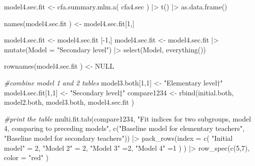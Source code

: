 \documentclass[
]{article}
\newenvironment{Shaded}{\begin{snugshade}}{\end{snugshade}}
\newcommand{\AttributeTok}[1]{\textcolor[rgb]{0.77,0.63,0.00}{#1}}
\newcommand{\CommentTok}[1]{\textcolor[rgb]{0.56,0.35,0.01}{\textit{#1}}}
\newcommand{\ConstantTok}[1]{\textcolor[rgb]{0.00,0.00,0.00}{#1}}
\newcommand{\DecValTok}[1]{\textcolor[rgb]{0.00,0.00,0.81}{#1}}
\newcommand{\FunctionTok}[1]{\textcolor[rgb]{0.00,0.00,0.00}{#1}}
\newcommand{\NormalTok}[1]{#1}
\newcommand{\OtherTok}[1]{\textcolor[rgb]{0.56,0.35,0.01}{#1}}
\newcommand{\SpecialCharTok}[1]{\textcolor[rgb]{0.00,0.00,0.00}{#1}}
\newcommand{\StringTok}[1]{\textcolor[rgb]{0.31,0.60,0.02}{#1}}
\begin{document}
\begin{Shaded}
\begin{Highlighting}[]
\NormalTok{model4.sec.fit }\OtherTok{\textless{}{-}} 
  \FunctionTok{cfa.summary.mlm.a}\NormalTok{(}
\NormalTok{    cfa4.sec}
\NormalTok{    ) }\SpecialCharTok{|\textgreater{}} 
  \FunctionTok{t}\NormalTok{() }\SpecialCharTok{|\textgreater{}} 
  \FunctionTok{as.data.frame}\NormalTok{()}

\FunctionTok{names}\NormalTok{(model4.sec.fit ) }\OtherTok{\textless{}{-}}\NormalTok{ model4.sec.fit[}\DecValTok{1}\NormalTok{,]}

\NormalTok{model4.sec.fit }\OtherTok{\textless{}{-}}\NormalTok{ model4.sec.fit [}\SpecialCharTok{{-}}\DecValTok{1}\NormalTok{,]}
\NormalTok{model4.sec.fit  }\OtherTok{\textless{}{-}} 
\NormalTok{  model4.sec.fit  }\SpecialCharTok{|\textgreater{}} 
  \FunctionTok{mutate}\NormalTok{(}\AttributeTok{Model =} \StringTok{"Secondary level"}\NormalTok{) }\SpecialCharTok{|\textgreater{}} 
  \FunctionTok{select}\NormalTok{(Model, }\FunctionTok{everything}\NormalTok{())}

\FunctionTok{rownames}\NormalTok{(model4.sec.fit ) }\OtherTok{\textless{}{-}} \ConstantTok{NULL}

\CommentTok{\#combine model 1 and 2 tables}
\NormalTok{model3.both[}\DecValTok{1}\NormalTok{,}\DecValTok{1}\NormalTok{] }\OtherTok{\textless{}{-}} \StringTok{"Elementary level†"}
\NormalTok{model4.sec.fit[}\DecValTok{1}\NormalTok{,}\DecValTok{1}\NormalTok{] }\OtherTok{\textless{}{-}} \StringTok{"Secondary level‡"}
\NormalTok{compare1234 }\OtherTok{\textless{}{-}} 
  \FunctionTok{rbind}\NormalTok{(initial.both,}
\NormalTok{        model2.both, }
\NormalTok{        model3.both, }
\NormalTok{        model4.sec.fit )}

\CommentTok{\#print the table}
\FunctionTok{multi.fit.tab}\NormalTok{(compare1234, }
              \StringTok{"Fit indices for two subgroups, model 4, comparing to preceding models"}\NormalTok{,}
              \FunctionTok{c}\NormalTok{(}\StringTok{"Baseline model for elementary teachers"}\NormalTok{, }
                \StringTok{"Baseline model for secondary teachers"}\NormalTok{)) }\SpecialCharTok{|\textgreater{}} 
  \FunctionTok{pack\_rows}\NormalTok{(}\AttributeTok{index =} \FunctionTok{c}\NormalTok{(}
    \StringTok{"Initial model"} \OtherTok{=} \DecValTok{2}\NormalTok{,}
    \StringTok{"Model 2"} \OtherTok{=} \DecValTok{2}\NormalTok{,}
    \StringTok{"Model 3"} \OtherTok{=}\DecValTok{2}\NormalTok{,}
    \StringTok{"Model 4"} \OtherTok{=}\DecValTok{1}
\NormalTok{  )}
\NormalTok{  ) }\SpecialCharTok{|\textgreater{}} 
  \FunctionTok{row\_spec}\NormalTok{(}\FunctionTok{c}\NormalTok{(}\DecValTok{5}\NormalTok{,}\DecValTok{7}\NormalTok{), }
           \AttributeTok{color =} \StringTok{"red"}
\NormalTok{           )}
\end{Highlighting}
\end{Shaded}
\end{document}
